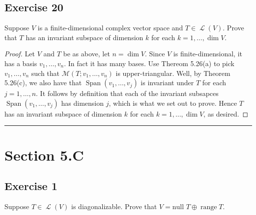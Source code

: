 \documentclass[letterpaper, 12pt]{amsart}
\DeclareMathOperator{\Ell}{\mathscr{L}}				%
\renewcommand{\null}{\text{null }}					%
\DeclareMathOperator{\range}{\text{range }}			%
\DeclareMathOperator{\Span}{Span}					%
\theoremstyle{definition}  							%
\begin{document}
		\subsection*{Exercise 20}
		Suppose $V$ is a finite-dimensional complex vector space and $T \in \Ell(V)$. 
		Prove that $T$ has an invariant subspace of dimension $k$ for each $k = 1, \dots, \dim{V}$.
		\vspace*{3mm}

		\begin{proof}
		Let $V$ and $T$ be as above, let $n = \dim V$.
		Since $V$ is finite-dimensional, it has a basis $v_{1}, \dots, v_{n}$.
		In fact it has many bases.
		Use Thereom 5.26(a) to pick $v_{1}, \dots, v_{n}$ such that $\mathcal{M}(T; v_{1}, \dots, v_{n})$ is upper-triangular.
		Well, by Theorem 5.26(c), we also have that $\Span(v_{1}, \dots, v_{j})$ is invariant under $T$ for each $j = 1, \dots, n$.
		It follows by definition that each of the invariant subsapces $\Span(v_{1}, \dots, v_{j})$ has dimension $j$, which is what we set out to prove.
		Hence $T$ has an invariant subspace of dimension $k$ for each $k = 1, \dots, \dim{V}$, as desired.
		\end{proof}
		\vspace*{2mm}
		\hrule
		\vspace*{2mm}

	\section*{Section 5.C}
		\subsection*{Exercise 1}
		Suppose $T \in \Ell(V)$ is diagonalizable. 
		Prove that $V = \null T \oplus \range T$.
		\vspace*{3mm}
\end{document}
